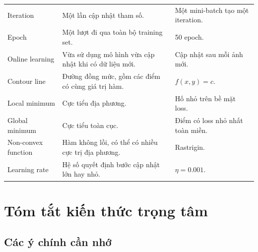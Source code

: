 \documentclass[12pt,a4paper]{report}
\begin{document}
\begin{longtable}{p{}p{}p{}}
Iteration & Một lần cập nhật tham số. & Một mini-batch tạo một iteration. \\

Epoch & Một lượt đi qua toàn bộ training set. & 50 epoch. \\

Online learning & Vừa sử dụng mô hình vừa cập nhật khi có dữ liệu mới. & Cập nhật sau mỗi ảnh mới. \\

Contour line & Đường đồng mức, gồm các điểm có cùng giá trị hàm. & $f(x,y)=c$. \\

Local minimum & Cực tiểu địa phương. & Hố nhỏ trên bề mặt loss. \\

Global minimum & Cực tiểu toàn cục. & Điểm có loss nhỏ nhất toàn miền. \\

Non-convex function & Hàm không lồi, có thể có nhiều cực trị địa phương. & Rastrigin. \\

Learning rate & Hệ số quyết định bước cập nhật lớn hay nhỏ. & $\eta=0.001$. \\

\bottomrule
\end{longtable}
\normalsize

\chapter{Tóm tắt kiến thức trọng tâm}

\section{Các ý chính cần nhớ}
\end{document}
